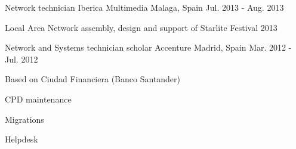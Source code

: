 \begin{cventries}
  \cventry
    {Network technician} %
    {Iberica Multimedia} %
    {Malaga, Spain} %
    {Jul. 2013 - Aug. 2013} %
    {
      \begin{cvitems} %
        \item {Local Area Network assembly, design and support of Starlite Festival 2013}
      \end{cvitems}
    }

  \cventry
    {Network and Systems technician scholar} %
    {Accenture} %
    {Madrid, Spain} %
    {Mar. 2012 - Jul. 2012} %
    {
      \begin{cvitems} %
        \item {Based on Ciudad Financiera (Banco Santander)}
        \item {CPD maintenance}
        \item {Migrations}
        \item {Helpdesk}
      \end{cvitems}
    }

\end{cventries}
